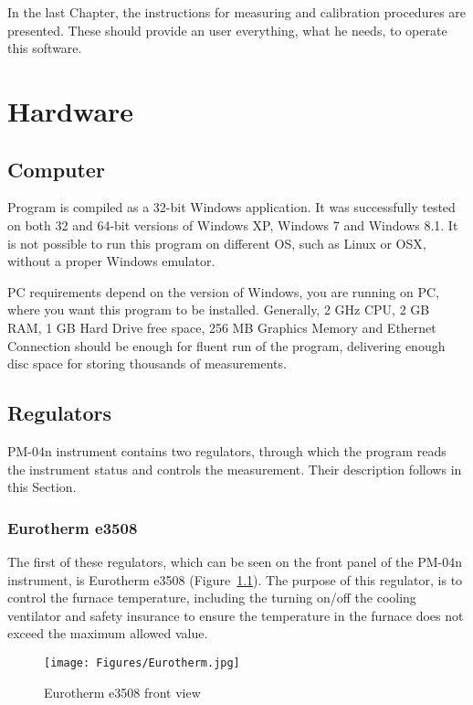 \documentclass[a4paper,11pt,oneside]{report}
\theoremstyle{named}
\begin{document}
In the last Chapter, the instructions for measuring and calibration procedures
are presented. These should provide an user everything, what he needs, to operate
this software.


\chapter{Hardware}
\label{ch:Hardware}

\section{Computer}

Program is compiled as a 32-bit Windows application. It was successfully tested
on both 32 and 64-bit versions of Windows XP, Windows 7 and Windows 8.1. It is
not possible to run this program on different OS, such as Linux or OSX, without
a proper Windows emulator.

PC requirements depend on the version of Windows, you are running on PC,
where you want this program to be installed. Generally, 2 GHz CPU, 2 GB RAM,
1 GB Hard Drive free space, 256 MB Graphics Memory and Ethernet Connection
should be enough for fluent run of the program, delivering enough disc space for
storing thousands of measurements. 

\section{Regulators}

PM-04n instrument contains two regulators, through which the program reads the
instrument status and controls the measurement. Their description follows in
this Section.

\subsection{Eurotherm e3508}
\label{sec:Eurotherm}

The first of these regulators, which can be seen on the front panel of the
PM-04n instrument, is Eurotherm e3508 (Figure~\ref{fig:e3508Front}). The purpose
of this regulator, is to control the furnace temperature, including the turning
on/off the cooling ventilator and safety insurance to ensure the temperature in
the furnace does not exceed the maximum allowed value. 

\begin{figure}[t]
  \centering
  \texttt{[image: Figures/Eurotherm.jpg]}
  \caption{Eurotherm e3508 front view}
  \label{fig:e3508Front}
\end{figure}
\end{document}
